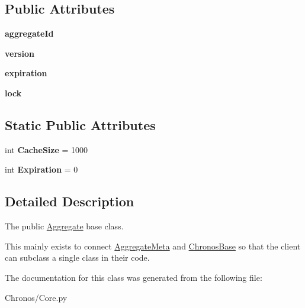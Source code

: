 \subsection*{Public Attributes}
\begin{DoxyCompactItemize}
\item 
{\bfseries aggregate\+Id}
\item 
{\bfseries version}
\item 
{\bfseries expiration}
\item 
{\bfseries lock}
\end{DoxyCompactItemize}
\subsection*{Static Public Attributes}
\begin{DoxyCompactItemize}
\item 
int {\bfseries Cache\+Size} = 1000
\item 
int {\bfseries Expiration} = 0
\end{DoxyCompactItemize}


\subsection{Detailed Description}
The public \hyperlink{classChronos_1_1Core_1_1Aggregate}{Aggregate} base class. 

This mainly exists to connect \hyperlink{classChronos_1_1Core_1_1AggregateMeta}{Aggregate\+Meta} and \hyperlink{classChronos_1_1Core_1_1ChronosBase}{Chronos\+Base} so that the client can subclass a single class in their code. 

The documentation for this class was generated from the following file\+:\begin{DoxyCompactItemize}
\item 
Chronos/Core.\+py\end{DoxyCompactItemize}
